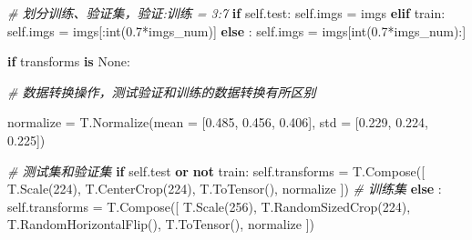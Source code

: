 \documentclass[11pt]{article}
\newenvironment{Shaded}{}{}
\newcommand{\KeywordTok}[1]{\textcolor[rgb]{0.00,0.44,0.13}{\textbf{{#1}}}}
\newcommand{\DecValTok}[1]{\textcolor[rgb]{0.25,0.63,0.44}{{#1}}}
\newcommand{\FloatTok}[1]{\textcolor[rgb]{0.25,0.63,0.44}{{#1}}}
\newcommand{\CommentTok}[1]{\textcolor[rgb]{0.38,0.63,0.69}{\textit{{#1}}}}
\newcommand{\NormalTok}[1]{{#1}}
\newcommand{\VariableTok}[1]{\textcolor[rgb]{0.10,0.09,0.49}{{#1}}}
\newcommand{\ControlFlowTok}[1]{\textcolor[rgb]{0.00,0.44,0.13}{\textbf{{#1}}}}
\newcommand{\OperatorTok}[1]{\textcolor[rgb]{0.40,0.40,0.40}{{#1}}}
\newcommand{\BuiltInTok}[1]{{#1}}
\begin{document}
\begin{Shaded}
\begin{Highlighting}[]
        \CommentTok{# 划分训练、验证集，验证:训练 = 3:7}
        \ControlFlowTok{if} \VariableTok{self}\NormalTok{.test:}
            \VariableTok{self}\NormalTok{.imgs }\OperatorTok{=}\NormalTok{ imgs}
        \ControlFlowTok{elif}\NormalTok{ train:}
            \VariableTok{self}\NormalTok{.imgs }\OperatorTok{=}\NormalTok{ imgs[:}\BuiltInTok{int}\NormalTok{(}\FloatTok{0.7}\OperatorTok{*}\NormalTok{imgs_num)]}
        \ControlFlowTok{else}\NormalTok{ :}
            \VariableTok{self}\NormalTok{.imgs }\OperatorTok{=}\NormalTok{ imgs[}\BuiltInTok{int}\NormalTok{(}\FloatTok{0.7}\OperatorTok{*}\NormalTok{imgs_num):]            }
    
        \ControlFlowTok{if}\NormalTok{ transforms }\KeywordTok{is} \VariableTok{None}\NormalTok{:}
        
            \CommentTok{# 数据转换操作，测试验证和训练的数据转换有所区别}
            
\NormalTok{            normalize }\OperatorTok{=}\NormalTok{ T.Normalize(mean }\OperatorTok{=}\NormalTok{ [}\FloatTok{0.485}\NormalTok{, }\FloatTok{0.456}\NormalTok{, }\FloatTok{0.406}\NormalTok{], }
\NormalTok{                                     std }\OperatorTok{=}\NormalTok{ [}\FloatTok{0.229}\NormalTok{, }\FloatTok{0.224}\NormalTok{, }\FloatTok{0.225}\NormalTok{])}

            \CommentTok{# 测试集和验证集}
            \ControlFlowTok{if} \VariableTok{self}\NormalTok{.test }\KeywordTok{or} \KeywordTok{not}\NormalTok{ train: }
                \VariableTok{self}\NormalTok{.transforms }\OperatorTok{=}\NormalTok{ T.Compose([}
\NormalTok{                    T.Scale(}\DecValTok{224}\NormalTok{),}
\NormalTok{                    T.CenterCrop(}\DecValTok{224}\NormalTok{),}
\NormalTok{                    T.ToTensor(),}
\NormalTok{                    normalize}
\NormalTok{                ]) }
            \CommentTok{# 训练集}
            \ControlFlowTok{else}\NormalTok{ :}
                \VariableTok{self}\NormalTok{.transforms }\OperatorTok{=}\NormalTok{ T.Compose([}
\NormalTok{                    T.Scale(}\DecValTok{256}\NormalTok{),}
\NormalTok{                    T.RandomSizedCrop(}\DecValTok{224}\NormalTok{),}
\NormalTok{                    T.RandomHorizontalFlip(),}
\NormalTok{                    T.ToTensor(),}
\NormalTok{                    normalize}
\NormalTok{                ]) }
                

\end{Highlighting}
\end{Shaded}
\end{document}
